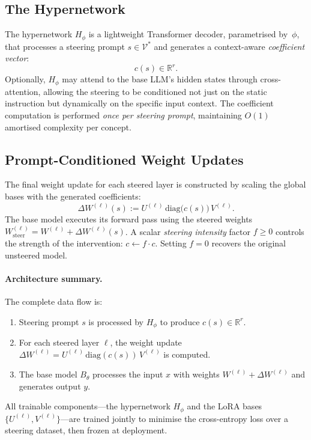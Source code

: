 \subsection{The Hypernetwork}
\label{subsec:hypernetwork}

The hypernetwork $H_\phi$ is a lightweight Transformer decoder, parametrised by~$\phi$, that processes a steering prompt $s\in\mathcal{V}^*$ and generates a context-aware \emph{coefficient vector}:
\begin{equation}\label{eq:coeff-vector}
  c(s) \in \mathbb{R}^r.
\end{equation}
Optionally, $H_\phi$ may attend to the base LLM's hidden states through cross-attention, allowing the steering to be conditioned not just on the static instruction but dynamically on the specific input context. The coefficient computation is performed \emph{once per steering prompt}, maintaining $O(1)$ amortised complexity per concept.

\subsection{Prompt-Conditioned Weight Updates}
\label{subsec:weight-updates}

The final weight update for each steered layer is constructed by scaling the global bases with the generated coefficients:
\begin{equation}\label{eq:weight-update}
  \Delta W^{(\ell)}(s) := U^{(\ell)}\,\mathrm{diag}\bigl(c(s)\bigr)\,V^{(\ell)}.
\end{equation}
The base model executes its forward pass using the steered weights $W_{\mathrm{steer}}^{(\ell)} = W^{(\ell)} + \Delta W^{(\ell)}(s)$. A scalar \emph{steering intensity} factor $f\geq 0$ controls the strength of the intervention: $c \leftarrow f\cdot c$. Setting $f=0$ recovers the original unsteered model.

\paragraph{Architecture summary.} The complete data flow is:
\begin{enumerate}[label=(\arabic*)]
  \item Steering prompt $s$ is processed by $H_\phi$ to produce $c(s)\in\mathbb{R}^r$.
  \item For each steered layer $\ell$, the weight update $\Delta W^{(\ell)} = U^{(\ell)}\,\mathrm{diag}(c(s))\,V^{(\ell)}$ is computed.
  \item The base model $B_\theta$ processes the input $x$ with weights $W^{(\ell)} + \Delta W^{(\ell)}$ and generates output $y$.
\end{enumerate}
All trainable components---the hypernetwork $H_\phi$ and the LoRA bases $\{U^{(\ell)}, V^{(\ell)}\}$---are trained jointly to minimise the cross-entropy loss over a steering dataset, then frozen at deployment.

